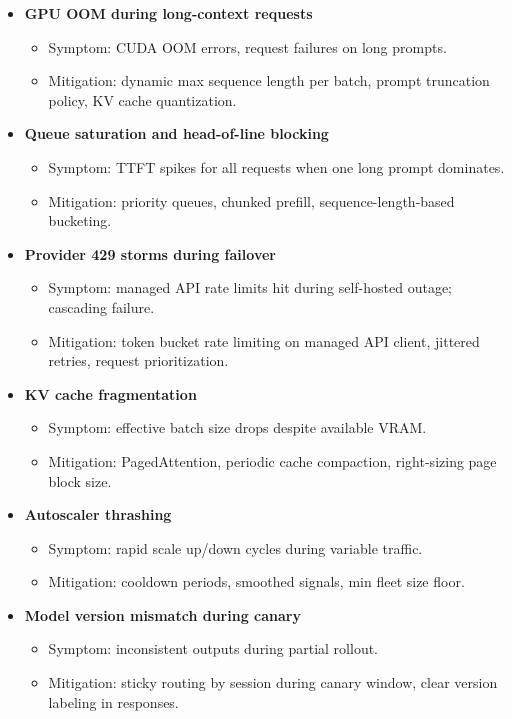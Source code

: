 \begin{itemize}
  \item \textbf{GPU OOM during long-context requests}
  \begin{itemize}
    \item Symptom: CUDA OOM errors, request failures on long prompts.
    \item Mitigation: dynamic max sequence length per batch, prompt truncation policy, KV cache quantization.
  \end{itemize}

  \item \textbf{Queue saturation and head-of-line blocking}
  \begin{itemize}
    \item Symptom: TTFT spikes for all requests when one long prompt dominates.
    \item Mitigation: priority queues, chunked prefill, sequence-length-based bucketing.
  \end{itemize}

  \item \textbf{Provider 429 storms during failover}
  \begin{itemize}
    \item Symptom: managed API rate limits hit during self-hosted outage; cascading failure.
    \item Mitigation: token bucket rate limiting on managed API client, jittered retries, request prioritization.
  \end{itemize}

  \item \textbf{KV cache fragmentation}
  \begin{itemize}
    \item Symptom: effective batch size drops despite available VRAM.
    \item Mitigation: PagedAttention, periodic cache compaction, right-sizing page block size.
  \end{itemize}

  \item \textbf{Autoscaler thrashing}
  \begin{itemize}
    \item Symptom: rapid scale up/down cycles during variable traffic.
    \item Mitigation: cooldown periods, smoothed signals, min fleet size floor.
  \end{itemize}

  \item \textbf{Model version mismatch during canary}
  \begin{itemize}
    \item Symptom: inconsistent outputs during partial rollout.
    \item Mitigation: sticky routing by session during canary window, clear version labeling in responses.
  \end{itemize}
\end{itemize}

